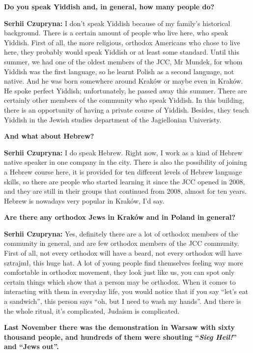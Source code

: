 \textbf{Do you speak Yiddish and, in general, how many people do?} \par
\textbf{Serhii Czupryna:} I don’t speak Yiddish because of my family’s historical background. There is a certain amount of people who live here, who speak Yiddish. First of all, the more religious, orthodox Americans who chose to live here, they probably would speak Yiddish or at least some standard. Until this summer, we had one of the oldest members of the JCC, Mr Mundek, for whom Yiddish was the first language, so he learnt Polish as a second language, not native. And he was born somewhere around Kraków or maybe even in Kraków. He spoke perfect Yiddish; unfortunately, he passed away this summer. There are certainly other members of the community who speak Yiddish. In this building, there is an opportunity of having a private course of Yiddish. Besides, they teach Yiddish in the Jewish studies department of the Jagiellonian Univeristy.\par
\textbf{And what about Hebrew?} \par
\textbf{Serhii Czupryna:} I do speak Hebrew. Right now, I work as a kind of Hebrew native speaker in one company in the city. There is also the possibility of joining a Hebrew course here, it is provided for ten different levels of Hebrew language skills, so there are people who started learning it since the JCC opened in 2008, and they are still in their groups that continued from 2008, almost for ten years. Hebrew is nowadays very popular in Kraków, I’d say.  \par 
\textbf{Are there any orthodox Jews in Kraków and in Poland in general?} \par 
\textbf{Serhii Czupryna:} Yes, definitely there are a lot of orthodox members of the community in general, and are few orthodox members of the JCC community. First of all, not every orthodox will have a beard, not every orthodox will have sztrajmł, this huge hat. A lot of young people find themselves feeling way more comfortable in orthodox movement, they look just like us, you can spot only certain things which show that a person may be orthodox. When it comes to interacting with them in everyday life, you would notice that if you say ``let’s eat a sandwich'', this person says ``oh, but I need to wash my hands''. And there is the whole ritual, it’s complicated, Judaism is complicated. \par
\textbf{Last November there was the demonstration in Warsaw with sixty thousand people, and hundreds of them were shouting ``\textit{Sieg Heil!}'' and ``Jews out''.}\par 
